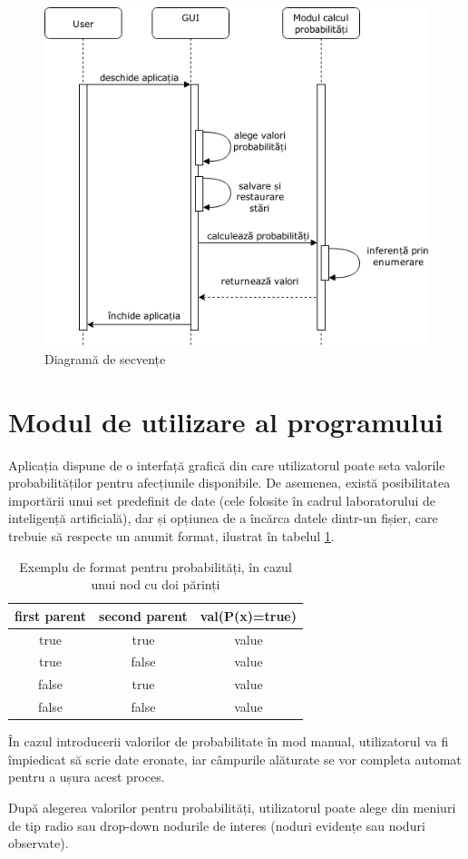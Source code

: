 \documentclass[12pt]{article}
\begin{document}
\begin{figure}[H]
	\centering
	\includegraphics[width=0.75\linewidth]{img/sequenceDiagram.png}
	\caption{Diagramă de secvențe}
\end{figure}
\section{Modul de utilizare al programului}
Aplicația dispune de o interfață grafică din care utilizatorul poate seta valorile probabilităților pentru afecțiunile disponibile. De asemenea, există posibilitatea importării unui set predefinit de date (cele folosite în cadrul laboratorului de inteligență artificială), dar și opțiunea de a încărca datele dintr-un fișier, care trebuie să respecte un anumit format, ilustrat în tabelul \ref{probabilitiesFileFormatTable}.

\begin{table}[h!]
	\begin{center}
	\caption{Exemplu de format pentru probabilități, în cazul unui nod cu doi părinți}
	\label{probabilitiesFileFormatTable}
\begin{tabular}{c|c|c}
	\hline
	\textbf{first parent}&\textbf{second parent} &\textbf{val(P(x)=true)}
	\\ \hline
	true & true & value \\
	true & false & value \\
	false & true & value \\
	false & false & value \\
	\hline
\end{tabular}
\end{center}
\end{table}
În cazul introducerii valorilor de probabilitate în mod manual, utilizatorul va fi împiedicat să scrie date eronate, iar câmpurile alăturate se vor completa automat pentru a ușura acest proces.
\par
După alegerea valorilor pentru probabilități, utilizatorul poate alege din meniuri de tip radio sau drop-down nodurile de interes (noduri evidențe sau noduri observate).
\end{document}
